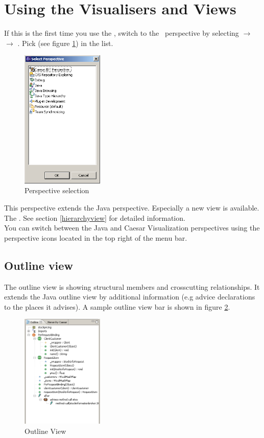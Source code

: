 \section{Using the Visualisers and Views}
If this is the first time you use the \cjdt, switch to the \caesarj ~perspective by selecting  $\rightarrow$  $\rightarrow$ . Pick  (see figure \ref{fig:select_persp}) in the list.

\begin{figure}[htbp]
	\centering
		\includegraphics[width=0.35\textwidth]{images/select_persp.png}
	\caption{Perspective selection}
	\label{fig:select_persp}
\end{figure}

This perspective extends the Java perspective. Especially a new view is available. The . See section \ref{hierarchyview} for detailed information.\\
You can switch between the Java and Caesar Visualization perspectives using the perspective icons located in the top right of the menu bar.\\
\subsection{Outline view}
The outline view is showing structural members and crosscutting relationships. It extends the Java outline view by additional information (e.g advice declarations to the places it advises). A sample outline view bar is shown in figure \ref{fig:outline_view}.

\begin{figure}[htbp]
	\centering
		\includegraphics[width=0.35\textwidth]{images/outline.png}
	\caption{Outline View}
	\label{fig:outline_view}
\end{figure}

